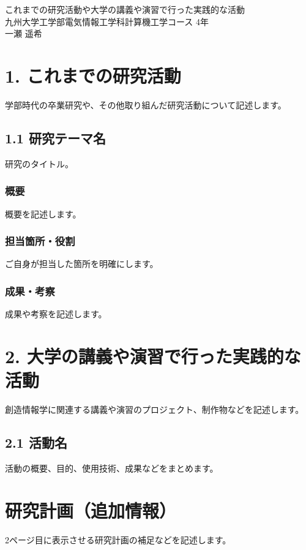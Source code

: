 \documentclass[main.tex]{subfiles}
\begin{document}
\begin{center}
    {\Large これまでの研究活動や大学の講義や演習で行った実践的な活動}\\[1em]
    九州大学工学部電気情報工学科計算機工学コース 4年\\
    一瀬 遥希
\end{center}
\vspace{1.5em}

\section*{1. これまでの研究活動}
学部時代の卒業研究や、その他取り組んだ研究活動について記述します。

\subsection*{1.1 研究テーマ名}
研究のタイトル。

\subsubsection*{概要}
概要を記述します。

\subsubsection*{担当箇所・役割}
ご自身が担当した箇所を明確にします。

\subsubsection*{成果・考察}
成果や考察を記述します。

\section*{2. 大学の講義や演習で行った実践的な活動}
創造情報学に関連する講義や演習のプロジェクト、制作物などを記述します。

\subsection*{2.1 活動名}
活動の概要、目的、使用技術、成果などをまとめます。

\section*{研究計画（追加情報）}
2ページ目に表示させる研究計画の補足などを記述します。
\end{document}
